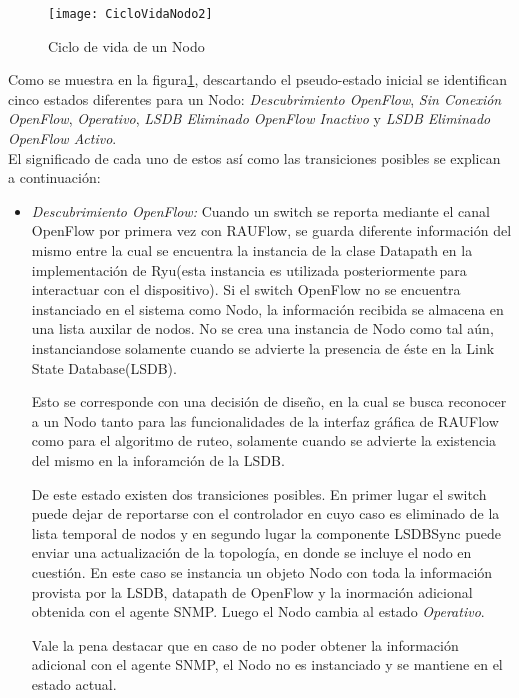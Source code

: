 \begin{figure}[ht!] 
\centering    
\texttt{[image: CicloVidaNodo2]}
\caption[Ciclo de vida de un Nodo]{Ciclo de vida de un Nodo}
\label{fig:CicloVidaNodo}
\end{figure}
  
Como se muestra en la figura\ref{fig:CicloVidaNodo}, descartando el pseudo-estado inicial se identifican cinco estados diferentes para un Nodo: \textit{Descubrimiento OpenFlow}, \textit{Sin Conexión OpenFlow}, \textit{Operativo}, \textit{LSDB Eliminado OpenFlow Inactivo} y \textit{LSDB Eliminado OpenFlow Activo}.\\

El significado de cada uno de estos as\'i como las transiciones posibles se explican a continuación:

\begin{itemize}
\item \textit{Descubrimiento OpenFlow:} Cuando un switch se reporta mediante el canal OpenFlow por primera vez con RAUFlow, se guarda diferente informaci\'on del mismo entre la cual se encuentra la instancia de la clase Datapath en la implementaci\'on de Ryu(esta instancia es utilizada posteriormente para interactuar con el dispositivo). Si el switch OpenFlow no se encuentra instanciado en el sistema como Nodo, la informaci\'on recibida se almacena en una lista auxilar de nodos. No se crea una instancia de Nodo como tal a\'un, instanciandose solamente cuando se advierte la presencia de \'este en la Link State Database(LSDB). 

Esto se corresponde con una decisión de diseño, en la cual se busca reconocer a un Nodo tanto para las funcionalidades de la interfaz gr\'afica de RAUFlow como para el algoritmo de ruteo, solamente cuando se advierte la existencia del mismo en la inforamci\'on de la LSDB. 

De este estado existen dos transiciones posibles. En primer lugar el switch puede dejar de reportarse con el controlador en cuyo caso es eliminado de la lista temporal de nodos y en segundo lugar la componente LSDBSync puede enviar una actualizaci\'on de la topolog\'ia, en donde se incluye el nodo en cuestión. En este caso se instancia un objeto Nodo con toda la informaci\'on provista por la LSDB, datapath de OpenFlow y la inormaci\'on adicional obtenida con el agente SNMP. Luego el Nodo cambia al estado \textit{Operativo}.

Vale la pena destacar que en caso de no poder obtener la informaci\'on adicional con el agente SNMP, el Nodo no es instanciado y se mantiene en el estado actual.


\end{itemize}
